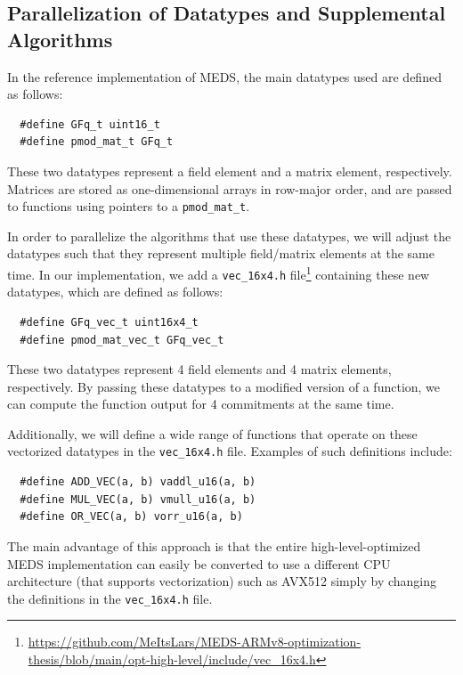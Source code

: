 \documentclass[11pt,a4paper]{report}
\theoremstyle{definition}
\begin{document}
\subsection{Parallelization of Datatypes and Supplemental Algorithms}
\label{sec:highleveldataalgorithms}
In the reference implementation of MEDS, the main datatypes used are defined as follows:
\begin{verbatim}
  #define GFq_t uint16_t
  #define pmod_mat_t GFq_t
\end{verbatim}
These two datatypes represent a field element and a matrix element, respectively. Matrices are stored as one-dimensional arrays in row-major order, and are passed to functions using pointers to a \texttt{pmod\_mat\_t}.

In order to parallelize the algorithms that use these datatypes, we will adjust the datatypes such that they represent multiple field/matrix elements at the same time. In our implementation, we add a \texttt{vec\_16x4.h} file\footnote{\url{https://github.com/MeItsLars/MEDS-ARMv8-optimization-thesis/blob/main/opt-high-level/include/vec\_16x4.h}} containing these new datatypes, which are defined as follows:
\begin{verbatim}
  #define GFq_vec_t uint16x4_t
  #define pmod_mat_vec_t GFq_vec_t
\end{verbatim}
These two datatypes represent 4 field elements and 4 matrix elements, respectively. By passing these datatypes to a modified version of a function, we can compute the function output for 4 commitments at the same time.

Additionally, we will define a wide range of functions that operate on these vectorized datatypes in the \texttt{vec\_16x4.h} file. Examples of such definitions include:
\begin{verbatim}
  #define ADD_VEC(a, b) vaddl_u16(a, b)
  #define MUL_VEC(a, b) vmull_u16(a, b)
  #define OR_VEC(a, b) vorr_u16(a, b)
\end{verbatim}
The main advantage of this approach is that the entire high-level-optimized MEDS implementation can easily be converted to use a different CPU architecture (that supports vectorization) such as AVX512 \cite{intel-avx512} simply by changing the definitions in the \texttt{vec\_16x4.h} file.
\end{document}
